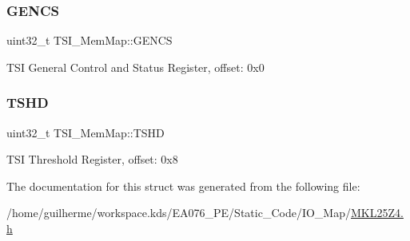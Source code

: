 \subsubsection{\texorpdfstring{G\+E\+N\+CS}{GENCS}}
{\footnotesize\ttfamily uint32\+\_\+t T\+S\+I\+\_\+\+Mem\+Map\+::\+G\+E\+N\+CS}

T\+SI General Control and Status Register, offset\+: 0x0 \mbox{\label{struct_t_s_i___mem_map_aeede6a8023aabcd9c6fff71419ae4cce}} 
\subsubsection{\texorpdfstring{T\+S\+HD}{TSHD}}
{\footnotesize\ttfamily uint32\+\_\+t T\+S\+I\+\_\+\+Mem\+Map\+::\+T\+S\+HD}

T\+SI Threshold Register, offset\+: 0x8 

The documentation for this struct was generated from the following file\+:\begin{DoxyCompactItemize}
\item 
/home/guilherme/workspace.\+kds/\+E\+A076\+\_\+\+P\+E/\+Static\+\_\+\+Code/\+I\+O\+\_\+\+Map/\hyperlink{_m_k_l25_z4_8h}{M\+K\+L25\+Z4.\+h}\end{DoxyCompactItemize}
